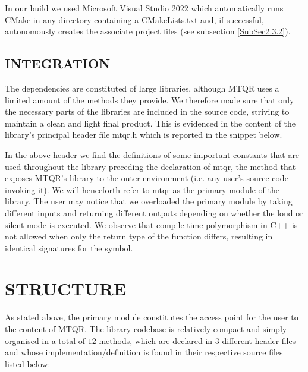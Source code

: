 \documentclass[a4paper, twosided]{book}
\begin{document}
\noindent
In our build we used Microsoft Visual Studio 2022 which automatically runs \colorbox{poliGrayBlue}{CMake} in any directory containing a \colorbox{poliGrayBlue}{CMakeLists.txt} and, if successful, autonomously creates the associate project files (see subsection \ref{SubSec2.3.2}).

\subsection[Integration]{\changefont INTEGRATION}\label{SubSec2.1.3}

\noindent
The dependencies are constituted of large libraries, although MTQR uses a limited amount of the methods they provide. We therefore made sure that only the necessary parts of the libraries are included in the source code, striving to maintain a clean and light final product. This is evidenced in the content of the library's principal header file \colorbox{poliGrayBlue}{mtqr.h} which is reported in the snippet below.

\vspace{0.2cm}
\newpage

\noindent
In the above header we find the definitions of some important constants that are used throughout the library preceding  the declaration of \colorbox{poliGrayBlue}{mtqr}, the method that exposes MTQR's library to the outer environment (i.e. any user's source code invoking it). We will henceforth refer to \colorbox{poliGrayBlue}{mtqr} as the primary module of the library. The user may notice that we overloaded the primary module by taking different inputs and returning different outputs depending on whether the loud or silent mode is executed. We observe that compile-time polymorphism in C++ is not allowed when only the return type of the function differs, resulting in identical signatures for the symbol.

\section[Structure]{\changefont STRUCTURE}\label{Sec2.2}

\noindent
 As stated above, the primary module constitutes the access point for the user to the content of MTQR. The library codebase is relatively compact and simply organised in a total of $12$ methods, which are declared in $3$ different header files and whose implementation/definition is found in their respective source files listed below:
\end{document}
